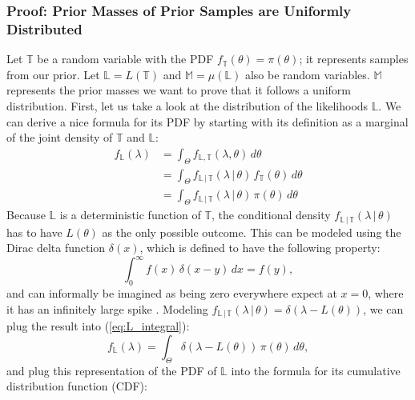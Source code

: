 \documentclass[12pt, a4paper]{report}
\begin{document}
\subsubsection{Proof: Prior Masses of Prior Samples are Uniformly Distributed}
Let $\mathbb{T}$ be a random variable with the PDF $f_{\mathbb{T}}(\theta) = \pi(\theta)$; it represents samples from our prior.
Let $\mathbb{L} = L(\mathbb{T})$ and $\mathbb{M} = \mu(\mathbb{L})$ also be random variables.
$\mathbb{M}$ represents the prior masses we want to prove that it follows a uniform distribution.
First, let us take a look at the distribution of the likelihoods $\mathbb{L}$.
We can derive a nice formula for its PDF by starting with its definition as a marginal of the joint density of $\mathbb{T}$ and $\mathbb{L}$:
\begin{align}
    f_\mathbb{L}(\lambda) &= \int_\Theta f_{\mathbb{L}, \mathbb{T}}(\lambda, \theta) \, d\theta \nonumber\\
    &= \int_\Theta f_{\mathbb{L} \,|\, \mathbb{T}}(\lambda \,|\, \theta) \, f_\mathbb{T}(\theta) \, d\theta \nonumber\\
    &= \int_\Theta f_{\mathbb{L} \,|\, \mathbb{T}}(\lambda \,|\, \theta) \, \pi(\theta) \, d\theta \label{eq:L_integral}
\end{align}
Because $\mathbb{L}$ is a deterministic function of $\mathbb{T}$, the conditional density $f_{\mathbb{L} \,|\, \mathbb{T}}(\lambda \,|\, \theta)$ has to have $L(\theta)$ as the only possible outcome.
This can be modeled using the Dirac delta function $\delta(x)$, which is defined to have the following property:
\begin{equation}
    \int_0^\infty f(x) \, \delta(x - y) \, dx = f(y), \label{eq:dirac_delta_property}
\end{equation}
and can informally be imagined as being zero everywhere expect at $x=0$, where it has an infinitely large spike \cite[600]{mckay}.
Modeling $f_{\mathbb{L} \,|\, \mathbb{T}}(\lambda \,|\, \theta) = \delta(\lambda - L(\theta))$, we can plug the result into (\ref{eq:L_integral}):
\begin{equation*}
    f_\mathbb{L}(\lambda) = \int_\Theta \delta(\lambda - L(\theta)) \, \pi(\theta) \, d\theta,
\end{equation*}
and plug this representation of the PDF of $\mathbb{L}$ into the formula for its cumulative distribution function (CDF):
\end{document}
